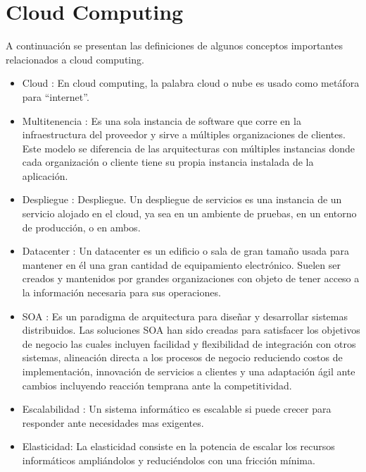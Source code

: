 \section{Cloud Computing}
 A continuación se presentan las definiciones de algunos conceptos importantes relacionados a cloud computing.
\begin{itemize}
\item Cloud : En cloud computing, la palabra cloud o nube es usado como metáfora para “internet”. 
\item Multitenencia : Es una sola instancia de software que corre en la infraestructura del proveedor y sirve a múltiples organizaciones de clientes. Este modelo se diferencia de las arquitecturas con múltiples instancias donde cada organización o cliente tiene su propia instancia instalada de la aplicación. 
\item Despliegue : Despliegue. Un despliegue de servicios es una instancia de un servicio alojado en el cloud, ya sea en un ambiente de pruebas, en un entorno de producción, o en ambos.
\item Datacenter : Un datacenter es un edificio o sala de gran tamaño usada para mantener en él una gran cantidad de equipamiento electrónico. Suelen ser creados y mantenidos por grandes organizaciones con objeto de tener acceso a la información necesaria para sus operaciones.
\item SOA : Es un paradigma de arquitectura para diseñar y desarrollar sistemas distribuidos. Las soluciones  SOA  han sido creadas para satisfacer los objetivos de negocio las cuales incluyen facilidad y flexibilidad de integración con otros sistemas, alineación directa a los procesos de negocio reduciendo costos de implementación, innovación de servicios a clientes y una adaptación ágil ante cambios incluyendo reacción temprana ante la competitividad.
\item Escalabilidad : Un sistema informático es escalable si puede crecer para responder ante necesidades mas exigentes. 
\item Elasticidad: La elasticidad consiste en la potencia de escalar los 
recursos informáticos ampliándolos y reduciéndolos con una fricción mínima. 
\end{itemize}


